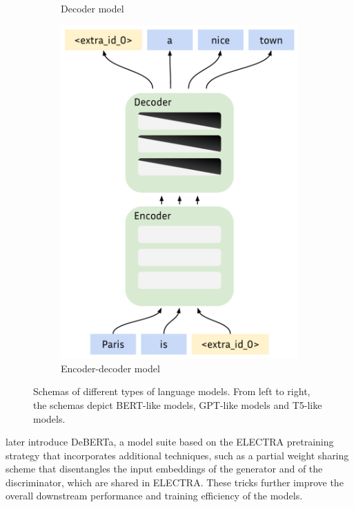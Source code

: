 \begin{figure}[ht]
\begin{subfigure}[b]{0.35\textwidth}
        \caption{Decoder model}
        \label{fig:gpt}
    \end{subfigure}
    \begin{subfigure}[b]{0.25\textwidth}
        \includegraphics[width=\textwidth]{sources/related_works/imgs/t5.pdf}
        \caption{Encoder-decoder model}
        \label{fig:t5}
    \end{subfigure}
    \caption{Schemas of different types of language models. From left to right, the schemas depict BERT-like models, GPT-like models and T5-like models.}
\end{figure}

\citet{deberta} later introduce DeBERTa, a model suite based on the ELECTRA pretraining strategy that incorporates additional techniques, such as a partial weight sharing scheme that disentangles the input embeddings of the generator and of the discriminator, which are shared in ELECTRA. These tricks further improve the overall downstream performance and training efficiency of the models.


